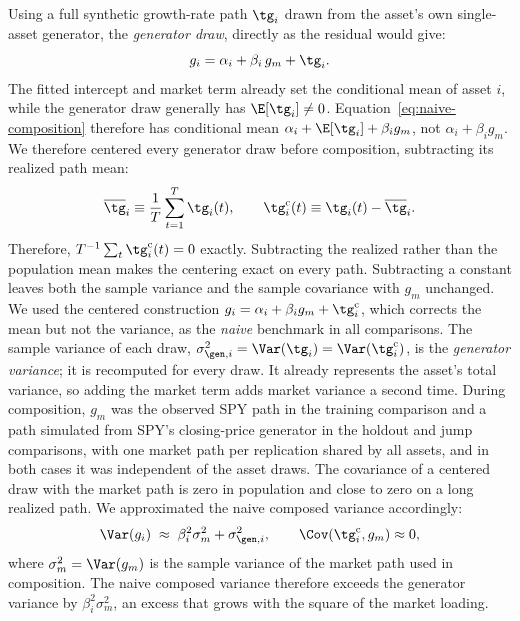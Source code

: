 Using a full synthetic growth-rate path $\tg_i$ drawn from the asset's
own single-asset generator, the \emph{generator draw}, directly as the
residual would give:
\begin{equation}\label{eq:naive-composition}
g_i = \alpha_i + \beta_i\, g_m + \tg_i.
\end{equation}
The fitted intercept and market term already set the conditional mean
of asset $i$, while the generator draw generally has
$\E[\tg_i]\ne 0$. Equation~\eqref{eq:naive-composition} therefore has
conditional mean $\alpha_i+\E[\tg_i]+\beta_i g_m$, not
$\alpha_i+\beta_i g_m$.
We therefore centered every generator draw before composition,
subtracting its realized path mean:
\begin{equation}
  \overline{\tg}_i \equiv \frac{1}{T}\sum_{t=1}^{T}\tg_i(t),
  \qquad
  \tg_i^{\mathrm c}(t) \equiv \tg_i(t)-\overline{\tg}_i.
  \label{eq:center-generator}
\end{equation}
Therefore, $T^{-1}\sum_t\tg_i^{\mathrm c}(t)=0$ exactly. Subtracting
the realized rather than the population mean makes the centering exact on every path. Subtracting a
constant leaves both the sample variance and the sample covariance with
$g_m$ unchanged. We used the centered construction
$g_i=\alpha_i+\beta_i g_m+\tg_i^{\mathrm c}$, which corrects the mean
but not the variance, as the \emph{naive} benchmark in all
comparisons. The sample variance of each draw,
$\sigma_{\gen,i}^2=\Var(\tg_i)=\Var(\tg_i^{\mathrm c})$, is the
\emph{generator variance}; it is recomputed for every draw. It already represents the asset's total
variance, so adding the market term adds market variance a second
time. During composition, $g_m$ was the observed SPY path in the training
comparison and a path simulated from SPY's closing-price generator in the holdout
and jump comparisons, with one market path per replication shared by
all assets, and
in both cases it was independent of the asset draws. The covariance
of a centered draw with the market path is zero in population and close to zero on a long realized
path. We approximated the naive composed variance accordingly:
\begin{equation}
  \Var(g_i)
  \;\approx\; \beta_i^2\sigma_m^2 + \sigma_{\gen,i}^2,
  \qquad \Cov(\tg_i^{\mathrm c},g_m)\approx 0,
  \label{eq:naive-inflation}
\end{equation}
where $\sigma_m^2=\Var(g_m)$ is the sample variance of the market path
used in composition. The naive composed variance therefore exceeds the generator variance
by $\beta_i^2\sigma_m^2$, an excess that grows with the square of the
market loading.

